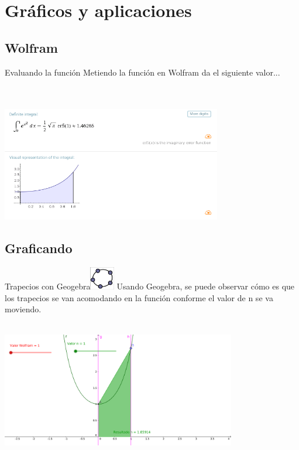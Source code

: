 \documentclass{beamer}
\begin{document}
\section{Gráficos y aplicaciones}
\subsection{Wolfram}
\begin{frame}{Evaluando la función}
Metiendo la función en Wolfram da el siguiente valor...\\
\\$\,$\\
	\begin{center}
		\includegraphics[height=5cm]{wolf.png}
    \end{center}
\end{frame}

\subsection{Graficando}
\begin{frame}{Trapecios con Geogebra\includegraphics[height=1cm]{geoico.png}}
Usando Geogebra, se puede observar cómo es que los trapecios se van acomodando en la función conforme el valor de n se va moviendo. 
\\$\,$\\
	\begin{center}
		\includegraphics[height=5cm]{geo.png}
    \end{center}
\end{frame}
\end{document}
